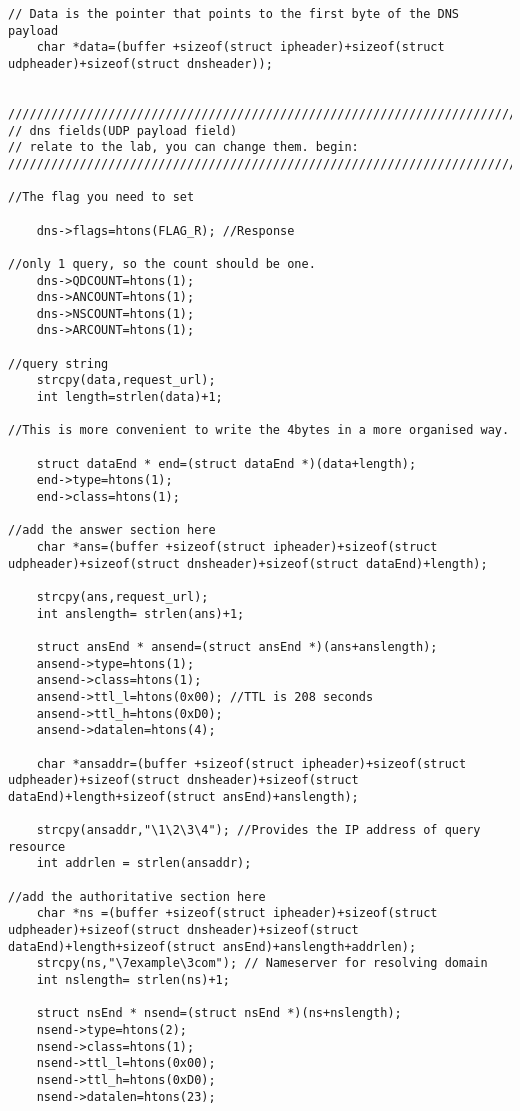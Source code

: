 \documentclass[a4paper,12pt]{article}
\begin{document}
\begin{verbatim}
// Data is the pointer that points to the first byte of the DNS payload
    char *data=(buffer +sizeof(struct ipheader)+sizeof(struct udpheader)+sizeof(struct dnsheader));


////////////////////////////////////////////////////////////////////////
// dns fields(UDP payload field)
// relate to the lab, you can change them. begin:
////////////////////////////////////////////////////////////////////////

//The flag you need to set

    dns->flags=htons(FLAG_R); //Response

//only 1 query, so the count should be one.
    dns->QDCOUNT=htons(1);
    dns->ANCOUNT=htons(1);
    dns->NSCOUNT=htons(1);
    dns->ARCOUNT=htons(1);

//query string
    strcpy(data,request_url);
    int length=strlen(data)+1;

//This is more convenient to write the 4bytes in a more organised way.

    struct dataEnd * end=(struct dataEnd *)(data+length);
    end->type=htons(1);
    end->class=htons(1);
    
//add the answer section here
    char *ans=(buffer +sizeof(struct ipheader)+sizeof(struct udpheader)+sizeof(struct dnsheader)+sizeof(struct dataEnd)+length);

    strcpy(ans,request_url);
    int anslength= strlen(ans)+1;

    struct ansEnd * ansend=(struct ansEnd *)(ans+anslength);
    ansend->type=htons(1);
    ansend->class=htons(1);
    ansend->ttl_l=htons(0x00); //TTL is 208 seconds
    ansend->ttl_h=htons(0xD0);
    ansend->datalen=htons(4);

    char *ansaddr=(buffer +sizeof(struct ipheader)+sizeof(struct udpheader)+sizeof(struct dnsheader)+sizeof(struct dataEnd)+length+sizeof(struct ansEnd)+anslength);

    strcpy(ansaddr,"\1\2\3\4"); //Provides the IP address of query resource 
    int addrlen = strlen(ansaddr);

//add the authoritative section here
    char *ns =(buffer +sizeof(struct ipheader)+sizeof(struct udpheader)+sizeof(struct dnsheader)+sizeof(struct dataEnd)+length+sizeof(struct ansEnd)+anslength+addrlen);
    strcpy(ns,"\7example\3com"); // Nameserver for resolving domain
    int nslength= strlen(ns)+1;

    struct nsEnd * nsend=(struct nsEnd *)(ns+nslength);
    nsend->type=htons(2);
    nsend->class=htons(1);
    nsend->ttl_l=htons(0x00);
    nsend->ttl_h=htons(0xD0);
    nsend->datalen=htons(23);


\end{verbatim}
\end{document}
